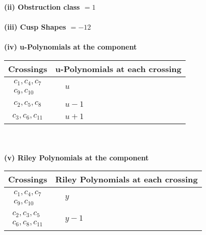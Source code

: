 \documentclass[1p]{elsarticle_modified}
\theoremstyle{definition}
\begin{document}
\flushleft \textbf{(ii) Obstruction class $= 1$}\\~\\
\flushleft \textbf{(iii) Cusp Shapes $= -12$}\\~\\
\newpage\renewcommand{\arraystretch}{1}
\flushleft \textbf{(iv) u-Polynomials at the component}\newline \\
\begin{tabular}{m{50pt}|m{274pt}}
Crossings & \hspace{64pt}u-Polynomials at each crossing \\
\hline $$\begin{aligned}c_{1},c_{4},c_{7}\\c_{9},c_{10}\end{aligned}$$&$\begin{aligned}
&u
\end{aligned}$\\
\hline $$\begin{aligned}c_{2},c_{5},c_{8}\end{aligned}$$&$\begin{aligned}
&u-1
\end{aligned}$\\
\hline $$\begin{aligned}c_{3},c_{6},c_{11}\end{aligned}$$&$\begin{aligned}
&u+1
\end{aligned}$\\
\hline
\end{tabular}\\~\\
\newpage\renewcommand{\arraystretch}{1}
\flushleft \textbf{(v) Riley Polynomials at the component}\newline \\
\begin{tabular}{m{50pt}|m{274pt}}
Crossings & \hspace{64pt}Riley Polynomials at each crossing \\
\hline $$\begin{aligned}c_{1},c_{4},c_{7}\\c_{9},c_{10}\end{aligned}$$&$\begin{aligned}
&y
\end{aligned}$\\
\hline $$\begin{aligned}c_{2},c_{3},c_{5}\\c_{6},c_{8},c_{11}\end{aligned}$$&$\begin{aligned}
&y-1
\end{aligned}$\\
\hline
\end{tabular}\\~\\
\end{document}
